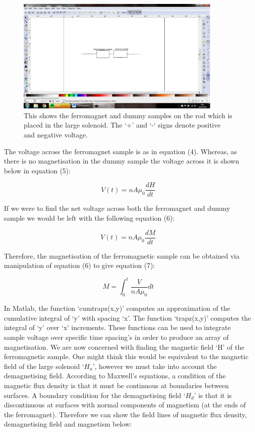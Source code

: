 \documentclass[a4paper]{article}\usepackage[english]{babel}
\begin{document}
\begin{figure}
\includegraphics[trim=350 350 350 300,clip,width=10cm,clip,width=\linewidth]{picture5.png}
\caption{\label{fig:picture5}This shows the ferromagnet and dummy samples on the rod which is placed in the large solenoid. The ‘+’ and ‘-‘ signs denote positive and negative voltage.}
\end{figure}

The voltage across the ferromagnet sample is as in equation (4). Whereas, as there is no magnetisation in the dummy sample the voltage across it is shown below in equation (5):

\begin{equation}\label{my_fifth_equation}
V(t)= nA\mu_0\frac{dH}{dt}
\end{equation}

If we were to find the net voltage across both the ferromagnet and dummy sample we would be left with the following equation (6):

\begin{equation}\label{my_sixth_equation}
V(t)= nA\mu_0\frac{dM}{dt}
\end{equation}

Therefore, the magnetisation of the ferromagnetic sample can be obtained via manipulation of equation (6) to give equation (7):

\begin{equation}\label{my_seventh_equation}
M=\int_{0}^{t}\frac{V}{nA\mu_0}dt
\end{equation}

In Matlab, the function ‘cumtrapz(x,y)’ computes an approximation of the cumulative integral of ‘y’ with spacing ‘x’. The function ‘trapz(x,y)’ computes the integral of ‘y’ over ‘x’ increments. These functions can be used to integrate sample voltage over specific time spacing’s in order to produce an array of magnetisation.
We are now concerned with finding the magnetic field ‘H’ of the ferromagnetic sample. One might think this would be equivalent to the magnetic field of the large solenoid ‘$H_a$’, however we must take into account the demagnetising field. 
According to Maxwell’s equations, a condition of the magnetic flux density is that it must be continuous at boundaries between surfaces. A boundary condition for the demagnetising field ‘$H_d$’ is that it is discontinuous at surfaces with normal components of magnetism (at the ends of the ferromagnet). Therefore we can show the field lines of magnetic flux density, demagnetising field and magnetism below:
\end{document}
